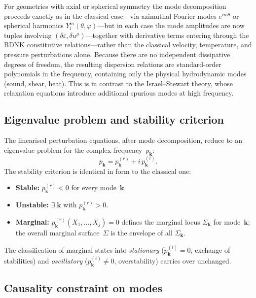 For geometries with axial or spherical symmetry the mode decomposition
proceeds exactly as in the classical case---via azimuthal Fourier modes
$e^{im\theta}$ or spherical harmonics $Y_l^m(\theta,\varphi)$---but
in each case the mode amplitudes are now tuples involving
$(\delta\varepsilon, \delta u^{\mu})$---together with derivative
terms entering through the BDNK constitutive relations---rather than
the classical velocity, temperature, and pressure perturbations alone.
Because there are no independent dissipative degrees of freedom, the
resulting dispersion relations are standard-order polynomials in the
frequency, containing only the physical hydrodynamic modes (sound,
shear, heat).  This is in contrast to the Israel--Stewart theory,
whose relaxation equations introduce additional spurious modes at
high frequency.

\subsection{Eigenvalue problem and stability criterion}

The linearised perturbation equations, after mode decomposition,
reduce to an eigenvalue problem for the complex
frequency~$p_{\mathbf{k}}$:
\begin{equation}
\label{eq:rel-1-15}
p_{\mathbf{k}} = p_{\mathbf{k}}^{(r)} + i\,p_{\mathbf{k}}^{(i)}.
\end{equation}
The stability criterion is identical in form to the classical one:
\begin{itemize}
\item \textbf{Stable:} $p_{\mathbf{k}}^{(r)} < 0$ for every
  mode~$\mathbf{k}$.
\item \textbf{Unstable:} $\exists\;\mathbf{k}$ with
  $p_{\mathbf{k}}^{(r)}>0$.
\item \textbf{Marginal:}
  $p_{\mathbf{k}}^{(r)}(X_1,\ldots,X_j)=0$ defines the marginal
  locus $\Sigma_{\mathbf{k}}$ for mode~$\mathbf{k}$; the overall
  marginal surface~$\Sigma$ is the envelope of all
  $\Sigma_{\mathbf{k}}$.
\end{itemize}
The classification of marginal states into \emph{stationary}
($p_{\mathbf{k}}^{(i)}=0$, exchange of stabilities) and
\emph{oscillatory} ($p_{\mathbf{k}}^{(i)}\neq 0$, overstability)
carries over unchanged.

\subsection{Causality constraint on modes}
\label{sec:rel-1-3d}

